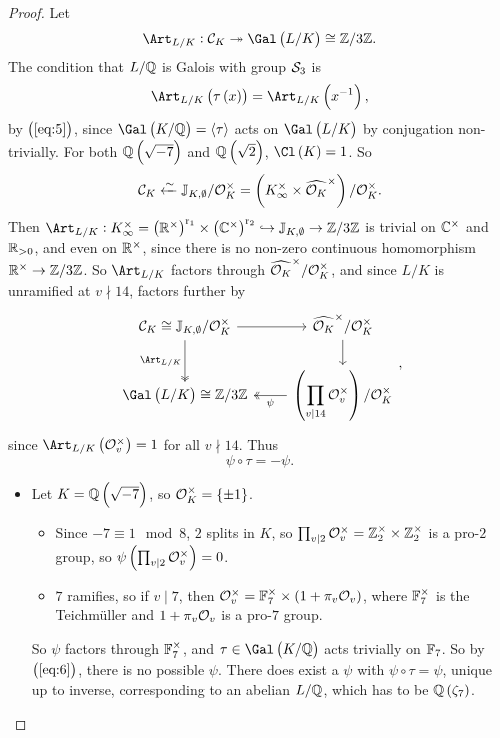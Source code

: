 \begin{proof}
Let
$$ \Art_{L / K} : \CCC_K \twoheadrightarrow \Gal\br{L / K} \cong \ZZ / 3\ZZ. $$
The condition that $ L / \mathbb{Q} $ is Galois with group $ \mathcal{S}_3 $ is
$$ \Art_{L / K}\br{\tau\br{x}} = \Art_{L / K}\br{x^{-1}}, $$
by $ \br{\ref{eq:5}} $, since $ \Gal\br{K / \QQ} = \abr{\tau} $ acts on $ \Gal\br{L / K} $ by conjugation non-trivially. For both $ \QQ\br{\sqrt{-7}} $ and $ \QQ\br{\sqrt{2}} $, $ \Cl\br{K} = 1 $. So
$$ \CCC_K \xleftarrow{\sim} \JJ_{K, \emptyset} / \OOO_K^\times = \br{K_\infty^\times \times \widehat{\OOO_K}^\times} / \OOO_K^\times. $$
Then $ \Art_{L / K} : K_\infty^\times = \br{\RR^\times}^{\r_1} \times \br{\CC^\times}^{\r_2} \hookrightarrow \JJ_{K, \emptyset} \to \ZZ / 3\ZZ $ is trivial on $ \mathbb{C}^\times $ and $ \mathbb{R}_{> 0} $, and even on $ \mathbb{R}^\times $, since there is no non-zero continuous homomorphism $ \mathbb{R}^\times \to \mathbb{Z} / 3\mathbb{Z} $. So $ \Art_{L / K} $ factors through $ \widehat{\mathcal{O}_K}^\times / \mathcal{O}_K^\times $, and since $ L / K $ is unramified at $ v \nmid 14 $, factors further by
$$
\begin{tikzcd}
\CCC_K \cong \JJ_{K, \emptyset} / \OOO_K^\times \arrow{r} \arrow[twoheadrightarrow]{d}[swap]{\Art_{L / K}} & \widehat{\OOO_K}^\times / \OOO_K^\times \arrow{d} \\
\Gal\br{L / K} \cong \ZZ / 3\ZZ & \br{\displaystyle\prod_{v \mid 14} \OOO_v^\times} / \OOO_K^\times \arrow[twoheadrightarrow]{l}{\psi}
\end{tikzcd},
$$
since $ \Art_{L / K}\br{\OOO_v^\times} = 1 $ for all $ v \nmid 14 $. Thus
\begin{equation}
\label{eq:6}
\psi \circ \tau = -\psi.
\end{equation}
\begin{itemize}
\item Let $ K = \QQ\br{\sqrt{-7}} $, so $ \OOO_K^\times = \cbr{\pm 1} $.
\begin{itemize}
\item Since $ -7 \equiv 1 \mod 8 $, $ 2 $ splits in $ K $, so $ \prod_{v \mid 2} \mathcal{O}_v^\times = \mathbb{Z}_2^\times \times \mathbb{Z}_2^\times $ is a pro-$ 2 $ group, so $ \psi\br{\prod_{v \mid 2} \OOO_v^\times} = 0 $.
\item $ 7 $ ramifies, so if $ v \mid 7 $, then $ \OOO_v^\times = \FF_7^\times \times \br{1 + \pi_v\OOO_v} $, where $ \mathbb{F}_7^\times $ is the Teichm\"uller and $ 1 + \pi_v\mathcal{O}_v $ is a pro-$ 7 $ group.
\end{itemize}
So $ \psi $ factors through $ \mathbb{F}_7^\times $, and $ \tau \in \Gal\br{K / \QQ} $ acts trivially on $ \mathbb{F}_7 $. So by $ \br{\ref{eq:6}} $, there is no possible $ \psi $. There does exist a $ \psi $ with $ \psi \circ \tau = \psi $, unique up to inverse, corresponding to an abelian $ L / \mathbb{Q} $, which has to be $ \QQ\br{\zeta_7} $.

\end{itemize}
\end{proof}

